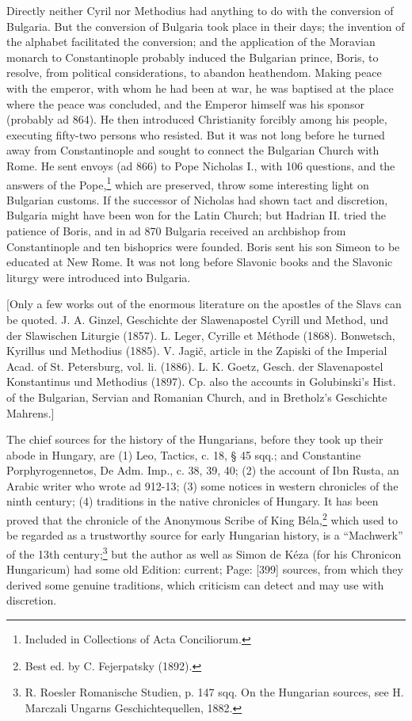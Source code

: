 Directly neither Cyril nor Methodius had anything to do with the conversion of Bulgaria. But the conversion of Bulgaria took place in their days; the invention of the alphabet facilitated the conversion; and the application of the Moravian monarch to Constantinople probably induced the Bulgarian prince, Boris, to resolve, from political considerations, to abandon heathendom. Making peace with the emperor, with whom he had been at war, he was baptised at the place where the peace was concluded, and the Emperor himself was his sponsor (probably ad 864). He then introduced Christianity forcibly among his people, executing fifty-two persons who resisted. But it was not long before he turned away from Constantinople and sought to connect the Bulgarian Church with Rome. He sent envoys (ad 866) to Pope Nicholas I., with 106 questions, and the answers of the Pope,\footnote{Included in Collections of Acta Conciliorum.} which are preserved, throw some interesting light on Bulgarian customs. If the successor of Nicholas had shown tact and discretion, Bulgaria might have been won for the Latin Church; but Hadrian II. tried the patience of Boris, and in ad 870 Bulgaria received an archbishop from Constantinople and ten bishoprics were founded. Boris sent his son Simeon to be educated at New Rome. It was not long before Slavonic books and the Slavonic liturgy were introduced into Bulgaria.

[Only a few works out of the enormous literature on the apostles of the Slavs can be quoted. J. A. Ginzel, Geschichte der Slawenapostel Cyrill und Method, und der Slawischen Liturgie (1857). L. Leger, Cyrille et Méthode (1868). Bonwetsch, Kyrillus und Methodius (1885). V. Jagič, article in the Zapiski of the Imperial Acad. of St. Petersburg, vol. li. (1886). L. K. Goetz, Gesch. der Slavenapostel Konstantinus und Methodius (1897). Cp. also the accounts in Golubinski\texthebrew{}’s Hist. of the Bulgarian, Servian and Romanian Church, and in Bretholz\texthebrew{}’s Geschichte Mahrens.]


The chief sources for the history of the Hungarians, before they took up their abode in Hungary, are (1) Leo, Tactics, c. 18, § 45 sqq.; and Constantine Porphyrogennetos, De Adm. Imp., c. 38, 39, 40; (2) the account of Ibn Rusta, an Arabic writer who wrote ad 912-13; (3) some notices in western chronicles of the ninth century; (4) traditions in the native chronicles of Hungary. It has been proved that the chronicle of the Anonymous Scribe of King Béla,\footnote{Best ed. by C. Fejerpatsky (1892).} which used to be regarded as a trustworthy source for early Hungarian history, is a \texthebrew{“}Machwerk\texthebrew{}” of the 13th century;\footnote{R. Roesler Romanische Studien, p. 147 sqq. On the Hungarian sources, see H. Marczali Ungarns Geschichtequellen, 1882.} but the author as well as Simon de Kéza (for his Chronicon Hungaricum) had some old Edition: current; Page: [399] sources, from which they derived some genuine traditions, which criticism can detect and may use with discretion.

